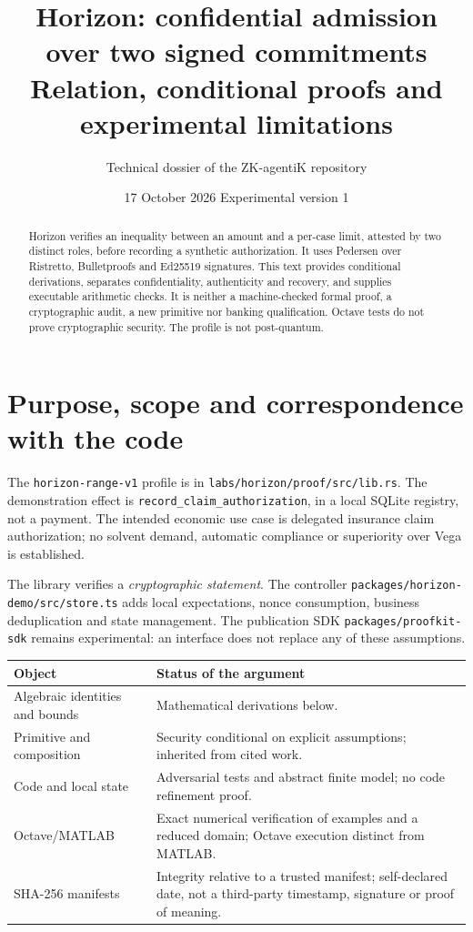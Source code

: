 \documentclass[11pt,a4paper]{article}
\title{Horizon: confidential admission over two signed commitments\\
  \large Relation, conditional proofs and experimental limitations}
\author{Technical dossier of the ZK-agentiK repository}
\date{17 October 2026 \quad Experimental version 1}
\newcommand{\code}[1]{\nolinkurl{#1}}
\begin{document}
\maketitle
\begin{abstract}
Horizon verifies an inequality between an amount and a per-case limit,
attested by two distinct roles, before recording a synthetic authorization.
It uses Pedersen over Ristretto, Bulletproofs and Ed25519 signatures.
This text provides conditional derivations, separates confidentiality,
authenticity and recovery, and supplies executable arithmetic checks.
It is neither a machine-checked formal proof, a cryptographic audit, a new
primitive nor banking qualification. Octave tests do not prove cryptographic
security. The profile is not post-quantum.
\end{abstract}
\tableofcontents
\newpage

\section{Purpose, scope and correspondence with the code}
The \code{horizon-range-v1} profile is in
\code{labs/horizon/proof/src/lib.rs}. The demonstration effect is
\code{record_claim_authorization}, in a local SQLite registry, not a payment.
The intended economic use case is delegated insurance claim authorization;
no solvent demand, automatic compliance or superiority over Vega is established.

The library verifies a \emph{cryptographic statement}. The controller
\code{packages/horizon-demo/src/store.ts} adds local expectations,
nonce consumption, business deduplication and state management. The publication
SDK \code{packages/proofkit-sdk} remains experimental:
an interface does not replace any of these assumptions.

\begin{center}\small
\begin{tabular}{p{.27\linewidth}p{.63\linewidth}}
\toprule
Object & Status of the argument \\
\midrule
Algebraic identities and bounds & Mathematical derivations below. \\
Primitive and composition & Security conditional on explicit assumptions; inherited from cited work. \\
Code and local state & Adversarial tests and abstract finite model; no code refinement proof. \\
Octave/MATLAB & Exact numerical verification of examples and a reduced domain; Octave execution distinct from MATLAB. \\
SHA-256 manifests & Integrity relative to a trusted manifest; self-declared date, not a third-party timestamp, signature or proof of meaning. \\
\bottomrule
\end{tabular}\end{center}
\end{document}
